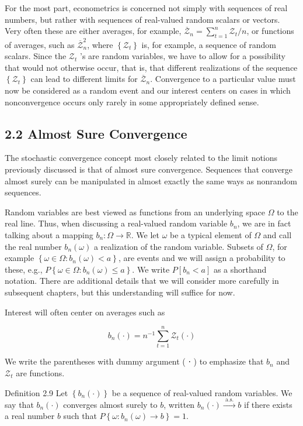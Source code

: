 \documentclass[10pt]{article}
\begin{document}
For the most part, econometrics is concerned not simply with sequences of real numbers, but rather with sequences of real-valued random scalars or vectors. Very often these are either averages, for example, $\overline{\mathcal{Z}}_{n}=\sum_{t=1}^{n} \mathcal{Z}_{t} / n$, or functions of averages, such as $\overline{\mathcal{Z}}_{n}^{2}$, where $\left\{\mathcal{Z}_{t}\right\}$ is, for example, a sequence of random scalars. Since the $\mathcal{Z}_{t}$ 's are random variables, we have to allow for a possibility that would not otherwise occur, that is, that different realizations of the sequence $\left\{\mathcal{Z}_{t}\right\}$ can lead to different limits for $\overline{\mathcal{Z}}_{n}$. Convergence to a particular value must now be considered as a random event and our interest centers on cases in which nonconvergence occurs only rarely in some appropriately defined sense.

\subsection*{2.2 Almost Sure Convergence}
The stochastic convergence concept most closely related to the limit notions previously discussed is that of almost sure convergence. Sequences that converge almost surely can be manipulated in almost exactly the same ways as nonrandom sequences.

Random variables are best viewed as functions from an underlying space $\Omega$ to the real line. Thus, when discussing a real-valued random variable $b_{n}$, we are in fact talking about a mapping $b_{n}: \Omega \rightarrow \mathbb{R}$. We let $\omega$ be a typical element of $\Omega$ and call the real number $b_{n}(\omega)$ a realization of the random variable. Subsets of $\Omega$, for example $\left\{\omega \in \Omega: b_{n}(\omega)<a\right\}$, are events and we will assign a probability to these, e.g., $P\left\{\omega \in \Omega: b_{n}(\omega) \leq a\right\}$. We write $P\left[b_{n}<a\right]$ as a shorthand notation. There are additional details that we will consider more carefully in subsequent chapters, but this understanding will suffice for now.

Interest will often center on averages such as

$$
b_{n}(\cdot)=n^{-1} \sum_{t=1}^{n} \mathcal{Z}_{t}(\cdot)
$$

We write the parentheses with dummy argument ( ⋅ ) to emphasize that $b_{n}$ and $\mathcal{Z}_{t}$ are functions.

Definition 2.9 Let $\left\{b_{n}(\cdot)\right\}$ be a sequence of real-valued random variables. We say that $b_{n}(\cdot)$ converges almost surely to $b$, written $b_{n}(\cdot) \xrightarrow{\text { a.s. }} b$ if there exists a real number $b$ such that $P\left\{\omega: b_{n}(\omega) \rightarrow b\right\}=1$.
\end{document}
